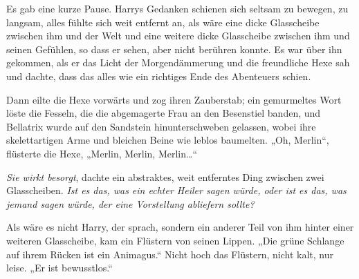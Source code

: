 Es gab eine kurze Pause. Harrys Gedanken schienen sich seltsam zu bewegen, zu langsam, alles fühlte sich weit entfernt an, als wäre eine dicke Glasscheibe zwischen ihm und der Welt und eine weitere dicke Glasscheibe zwischen ihm und seinen Gefühlen, so dass er sehen, aber nicht berühren konnte. Es war über ihn gekommen, als er das Licht der Morgendämmerung und die freundliche Hexe sah und dachte, dass das alles wie ein richtiges Ende des Abenteuers schien.

Dann eilte die Hexe vorwärts und zog ihren Zauberstab; ein gemurmeltes Wort löste die Fesseln, die die abgemagerte Frau an den Besenstiel banden, und Bellatrix wurde auf den Sandstein hinunterschweben gelassen, wobei ihre skelettartigen Arme und bleichen Beine wie leblos baumelten.
„Oh, Merlin“, flüsterte die Hexe,
„Merlin, Merlin, Merlin…“

\emph{Sie wirkt besorgt}, dachte ein abstraktes, weit entferntes Ding zwischen zwei Glasscheiben. \emph{Ist es das, was ein echter Heiler sagen würde, oder ist es das, was jemand sagen würde, der eine Vorstellung abliefern sollte?}

Als wäre es nicht Harry, der sprach, sondern ein anderer Teil von ihm hinter einer weiteren Glasscheibe, kam ein Flüstern von seinen Lippen.
„Die grüne Schlange auf ihrem Rücken ist ein Animagus.“ Nicht hoch das Flüstern, nicht kalt, nur leise.
„Er ist bewusstlos.“

